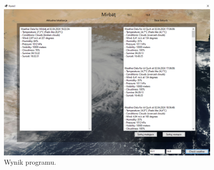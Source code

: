 \documentclass{report}
\begin{document}
\begin{figure}[H]%
	\centering
	\includegraphics[scale=0.6]{zdj/main}
	\caption{Wynik programu.}
\end{figure}
\end{document}
